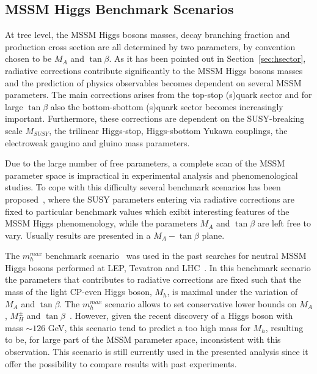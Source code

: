 \subsection{MSSM Higgs Benchmark Scenarios}
At tree level, the MSSM  Higgs bosons masses, decay branching fraction and production cross section are all determined by two parameters,
by convention chosen to be $M_A$ and $\tan\beta$. As it has been pointed out in Section~\ref{sec:hsector}, radiative corrections
contribute significantly to the MSSM Higgs bosons masses and the prediction of physics observables becomes 
dependent on several MSSM parameters.
The main corrections arises from the top-stop (s)quark sector and for large $\tan\beta$ also the bottom-sbottom (s)quark sector becomes increasingly 
important. Furthermore, these corrections are dependent on the SUSY-breaking scale $M_{SUSY}$, the trilinear Higgs-stop, 
Higgs-sbottom Yukawa couplings, the electroweak gaugino and gluino mass parameters.

Due to the large number of free parameters, a complete scan of the MSSM parameter space is impractical in experimental analysis and phenomenological
studies. To cope with this difficulty several benchmark scenarios has been proposed~\cite{LHCxsec,mhmax2}, where the SUSY parameters
 entering via radiative corrections 
are fixed to particular benchmark values which exibit interesting features of the MSSM Higgs phenomenology, while the parameters 
$M_A$ and $\tan\beta$ are left free to vary. Usually results are presented in a $M_A-\tan\beta$ plane.

The $m_h^{max}$ benchmark scenario~\cite{MSSMmhmax} was  used in the past searches for neutral MSSM Higgs bosons performed
at LEP, Tevatron and LHC~\cite{LEPLimits,TevatronLimits1,CMSLimit,ATLASLimit}. 
In this benchmark scenario the parameters that contributes to 
radiative corrections are fixed such that the mass of the light CP-even Higgs boson, 
$M_h$, is maximal under the variation of $M_A$ and $\tan\beta$. The $m_h^{max}$ scenario allows to set conservative 
lower bounds on $M_A$, $M_H^{\pm}$ and $\tan\beta$~\cite{mhmax2}. However, given the recent discovery of a Higgs
boson with mass $\sim 126$ GeV, this scenario
tend to predict a too high mass for $M_h$, resulting to be, for large part of the MSSM parameter space, 
inconsistent with this observation. This scenario is still currently used in the presented analysis since it offer the possibility to
compare results with past experiments. 

